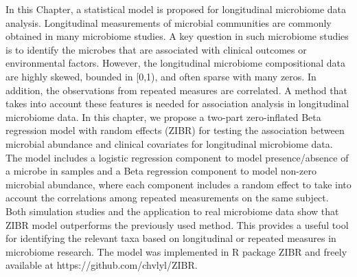  \label{chpt4:ZIBR}


In this Chapter, a statistical model is proposed for longitudinal microbiome data analysis. Longitudinal measurements of microbial communities are commonly obtained in many microbiome studies. A key question in such microbiome studies is to identify the microbes that are associated with clinical outcomes or environmental factors. However, the longitudinal microbiome compositional data are highly skewed, bounded in [0,1), and often sparse with many zeros. In addition, the observations from repeated measures are correlated. A method that takes into account these features is needed for association analysis in longitudinal microbiome data. In this chapter, we propose a two-part zero-inflated Beta regression model with random effects (ZIBR) for testing the association between microbial abundance and clinical covariates for longitudinal microbiome data. The model includes a logistic regression component to model presence/absence of a microbe in samples and a Beta regression component to model non-zero microbial abundance, where each component includes a random effect to take into account the correlations among repeated measurements on the same subject. Both simulation studies and the application to real microbiome data show that ZIBR model outperforms the previously used method. This provides a useful tool for identifying the relevant taxa based on longitudinal or repeated measures in microbiome research. The model was implemented in R package ZIBR and freely available at https://github.com/chvlyl/ZIBR.



